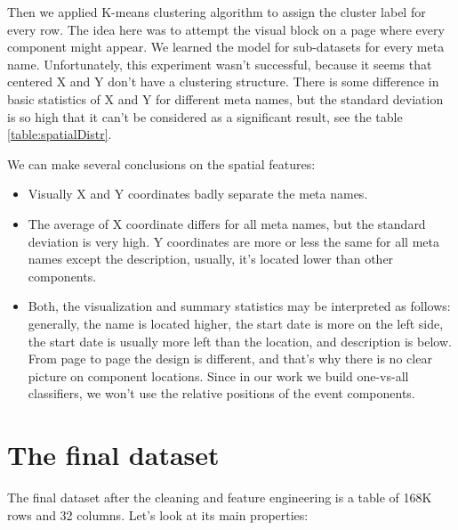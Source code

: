Then we applied K-means clustering algorithm to assign the cluster label for every row. The idea here was to attempt the visual block on a page where every component might appear. We learned the model for sub-datasets for every meta name. Unfortunately, this experiment wasn't successful, because it seems that centered X and Y don't have a clustering structure. There is some difference in basic statistics of X and Y for different meta names, but the standard deviation is so high that it can't be considered as a significant result, see the table \ref{table:spatialDistr}.


We can make several conclusions on the spatial features:
\begin{itemize}
    \item Visually X and Y coordinates badly separate the meta names.
    \item The average of X coordinate differs for all meta names, but the standard deviation is very high. Y coordinates are more or less the same for all meta names except the description, usually, it's located lower than other components.
    \item Both, the visualization and summary statistics may be interpreted as follows: generally, the name is located higher, the start date is more on the left side, the start date is usually more left than the location, and description is below. From page to page the design is different, and that's why there is no clear picture on component locations. Since in our work we build one-vs-all classifiers, we won't use the relative positions of the event components.     
\end{itemize}


\section{The final dataset}
The final dataset after the cleaning and feature engineering is a table of 168K rows and 32 columns. Let's look at its main properties: 

